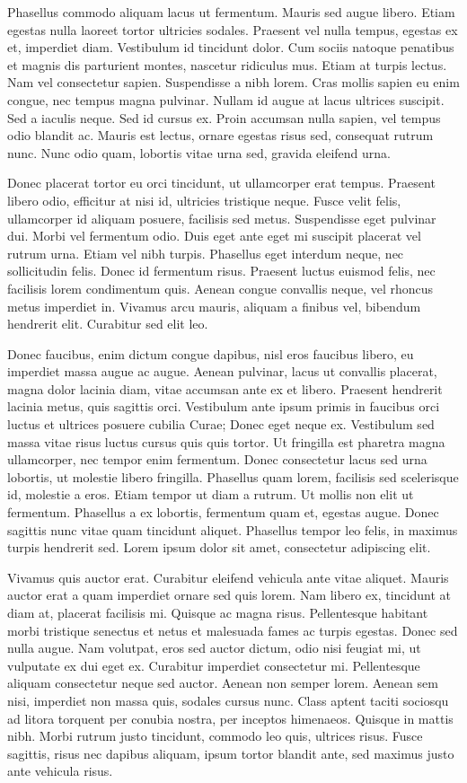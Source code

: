 \documentclass[twocolumn]{IEEEtran}
\begin{document}
Phasellus commodo aliquam lacus ut fermentum. Mauris sed augue libero. Etiam egestas nulla laoreet tortor ultricies sodales. Praesent vel nulla tempus, egestas ex et, imperdiet diam. Vestibulum id tincidunt dolor. Cum sociis natoque penatibus et magnis dis parturient montes, nascetur ridiculus mus. Etiam at turpis lectus. Nam vel consectetur sapien. Suspendisse a nibh lorem. Cras mollis sapien eu enim congue, nec tempus magna pulvinar. Nullam id augue at lacus ultrices suscipit. Sed a iaculis neque. Sed id cursus ex. Proin accumsan nulla sapien, vel tempus odio blandit ac. Mauris est lectus, ornare egestas risus sed, consequat rutrum nunc. Nunc odio quam, lobortis vitae urna sed, gravida eleifend urna.

Donec placerat tortor eu orci tincidunt, ut ullamcorper erat tempus. Praesent libero odio, efficitur at nisi id, ultricies tristique neque. Fusce velit felis, ullamcorper id aliquam posuere, facilisis sed metus. Suspendisse eget pulvinar dui. Morbi vel fermentum odio. Duis eget ante eget mi suscipit placerat vel rutrum urna. Etiam vel nibh turpis. Phasellus eget interdum neque, nec sollicitudin felis. Donec id fermentum risus. Praesent luctus euismod felis, nec facilisis lorem condimentum quis. Aenean congue convallis neque, vel rhoncus metus imperdiet in. Vivamus arcu mauris, aliquam a finibus vel, bibendum hendrerit elit. Curabitur sed elit leo.

Donec faucibus, enim dictum congue dapibus, nisl eros faucibus libero, eu imperdiet massa augue ac augue. Aenean pulvinar, lacus ut convallis placerat, magna dolor lacinia diam, vitae accumsan ante ex et libero. Praesent hendrerit lacinia metus, quis sagittis orci. Vestibulum ante ipsum primis in faucibus orci luctus et ultrices posuere cubilia Curae; Donec eget neque ex. Vestibulum sed massa vitae risus luctus cursus quis quis tortor. Ut fringilla est pharetra magna ullamcorper, nec tempor enim fermentum. Donec consectetur lacus sed urna lobortis, ut molestie libero fringilla. Phasellus quam lorem, facilisis sed scelerisque id, molestie a eros. Etiam tempor ut diam a rutrum. Ut mollis non elit ut fermentum. Phasellus a ex lobortis, fermentum quam et, egestas augue. Donec sagittis nunc vitae quam tincidunt aliquet. Phasellus tempor leo felis, in maximus turpis hendrerit sed. Lorem ipsum dolor sit amet, consectetur adipiscing elit.

Vivamus quis auctor erat. Curabitur eleifend vehicula ante vitae aliquet. Mauris auctor erat a quam imperdiet ornare sed quis lorem. Nam libero ex, tincidunt at diam at, placerat facilisis mi. Quisque ac magna risus. Pellentesque habitant morbi tristique senectus et netus et malesuada fames ac turpis egestas. Donec sed nulla augue. Nam volutpat, eros sed auctor dictum, odio nisi feugiat mi, ut vulputate ex dui eget ex. Curabitur imperdiet consectetur mi. Pellentesque aliquam consectetur neque sed auctor. Aenean non semper lorem. Aenean sem nisi, imperdiet non massa quis, sodales cursus nunc. Class aptent taciti sociosqu ad litora torquent per conubia nostra, per inceptos himenaeos. Quisque in mattis nibh. Morbi rutrum justo tincidunt, commodo leo quis, ultrices risus. Fusce sagittis, risus nec dapibus aliquam, ipsum tortor blandit ante, sed maximus justo ante vehicula risus.
\end{document}
